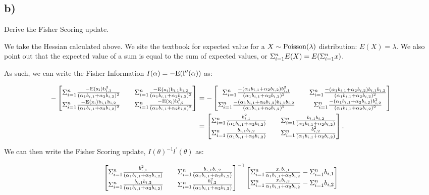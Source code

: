 \documentclass[]{article}
\begin{document}
\subsection{b)}\label{b}

Derive the Fisher Scoring update.

We take the Hessian calculated above. We site the textbook for expected
value for a \(X \sim \rm{Poisson}(\lambda)\) distribution:
\(E(X)=\lambda\). We also point out that the expected value of a sum is
equal to the sum of expected values, or \(\summ E(X) = E(\summ x)\).

As such, we can write the Fisher Information
\(I(\alpha) = -\rm{E}(l^{\prime\prime}(\alpha))\) as:

\begin{align*}
-\begin{bmatrix}
\summ \frac{-\rm{E}(x_i) b_{i, 1}^2}{(\pha)^2} && 
\summ \frac{-\rm{E}(x_i) b_{i, 1}b_{i, 2}}{(\pha)^2} \\
\summ \frac{-\rm{E}(x_i) b_{i, 1}b_{i, 2}}{(\pha)^2} &&
\summ \frac{-\rm{E}(x_i) b_{i, 2}^2}{(\pha)^2}
\end{bmatrix} &= -\begin{bmatrix}
\summ \frac{-(\pha) b_{i, 1}^2}{(\pha)^2} && 
\summ \frac{-(\pha) b_{i, 1}b_{i, 2}}{(\pha)^2} \\
\summ \frac{-(\pha) b_{i, 1}b_{i, 2}}{(\pha)^2} &&
\summ \frac{-(\pha) b_{i, 2}^2}{(\pha)^2}
\end{bmatrix} \\ &= 
\begin{bmatrix}
\summ \frac{b_{i, 1}^2}{(\pha)} && 
\summ \frac{b_{i, 1}b_{i, 2}}{(\pha)} \\
\summ \frac{b_{i, 1}b_{i, 2}}{(\pha)} &&
\summ \frac{b_{i, 2}^2}{(\pha)}
\end{bmatrix}. 
\end{align*}

We can then write the Fisher Scoring update,
\(I(\theta)^{-1} l^\prime(\theta)\) as:

\begin{align*}
\begin{bmatrix}
\summ \frac{b_{i, 1}^2}{(\pha)} && 
\summ \frac{b_{i, 1}b_{i, 2}}{(\pha)} \\
\summ \frac{b_{i, 1}b_{i, 2}}{(\pha)} &&
\summ \frac{b_{i, 2}^2}{(\pha)}
\end{bmatrix}^{-1}
\begin{bmatrix}
\summ \frac{x_i b_{i, 1}}{\pha} - \summ b_{i, 1} \\
\summ \frac{x_i b_{i, 2}}{\pha} - \summ b_{i, 2}
\end{bmatrix}
\end{align*}
\end{document}
